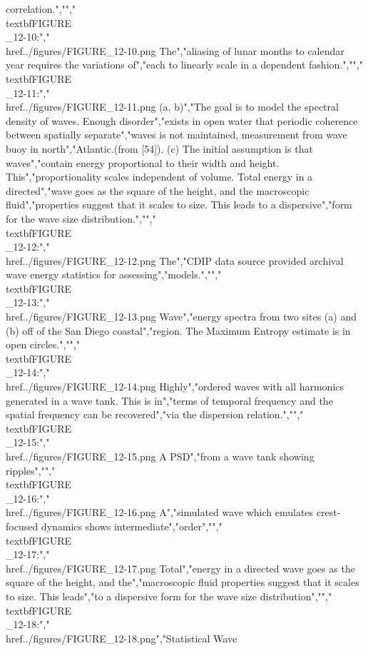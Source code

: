 {{{{{{{{{{correlation.","","\\textbf{FIGURE\\_12-10}:","\\href{../figures/FIGURE_12-10.png}{} The","aliasing of lunar months to calendar year requires the variations of","each to linearly scale in a dependent fashion.","","\\textbf{FIGURE\\_12-11}:","\\href{../figures/FIGURE_12-11.png}{} (a, b)","The goal is to model the spectral density of waves. Enough disorder","exists in open water that periodic coherence between spatially separate","waves is not maintained, measurement from wave buoy in north","Atlantic.(from {[}54{]}). (c) The initial assumption is that waves","contain energy proportional to their width and height. This","proportionality scales independent of volume. Total energy in a directed","wave goes as the square of the height, and the macroscopic fluid","properties suggest that it scales to size. This leads to a dispersive","form for the wave size distribution.","","\\textbf{FIGURE\\_12-12}:","\\href{../figures/FIGURE_12-12.png}{} The","CDIP data source provided archival wave energy statistics for assessing","models.","","\\textbf{FIGURE\\_12-13}:","\\href{../figures/FIGURE_12-13.png}{} Wave","energy spectra from two sites (a) and (b) off of the San Diego coastal","region. The Maximum Entropy estimate is in open circles.","","\\textbf{FIGURE\\_12-14}:","\\href{../figures/FIGURE_12-14.png}{} Highly","ordered waves with all harmonics generated in a wave tank. This is in","terms of temporal frequency and the spatial frequency can be recovered","via the dispersion relation.","","\\textbf{FIGURE\\_12-15}:","\\href{../figures/FIGURE_12-15.png}{} A PSD","from a wave tank showing ripples","","\\textbf{FIGURE\\_12-16}:","\\href{../figures/FIGURE_12-16.png}{} A","simulated wave which emulates crest-focused dynamics shows intermediate","order","","\\textbf{FIGURE\\_12-17}:","\\href{../figures/FIGURE_12-17.png}{} Total","energy in a directed wave goes as the square of the height, and the","macroscopic fluid properties suggest that it scales to size. This leads","to a dispersive form for the wave size distribution","","\\textbf{FIGURE\\_12-18}:","\\href{../figures/FIGURE_12-18.png}{}","Statistical Wave }}}}}}}}}}

